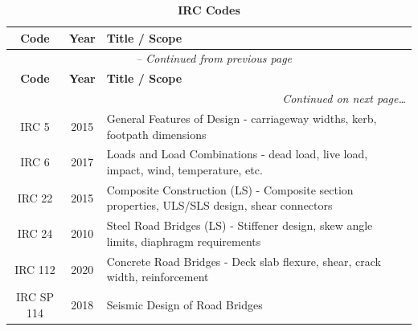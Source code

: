 \documentclass[12pt,a4paper]{report}
\numberwithin{table}{chapter}
\numberwithin{figure}{chapter}
\begin{document}
\begingroup
\setlength{\tabcolsep}{3.5pt}
\begin{longtable}{|c|c|p{12cm}|}
\caption{\textbf{IRC Codes}}\label{tab:irc-codes}\\
\hline
\textbf{Code} & \textbf{Year} & \textbf{Title / Scope} \\[6pt]
\hline
\endfirsthead

\multicolumn{3}{c}{\small\textit{\tablename\ \thetable{} -- Continued from previous page}} \\[4pt]
\hline
\textbf{Code} & \textbf{Year} & \textbf{Title / Scope} \\[6pt]
\hline
\endhead

\hline
\multicolumn{3}{|r|}{\footnotesize\textit{Continued on next page\dots}} \\
\hline
\endfoot

\hline
\endlastfoot

IRC 5 & 2015 & General Features of Design - carriageway widths, kerb, footpath dimensions \\ 
\hline
IRC 6 & 2017 & Loads and Load Combinations - dead load, live load, impact, wind, temperature, etc. \\ 
\hline
IRC 22 & 2015 & Composite Construction (LS) - Composite section properties, ULS/SLS design, shear connectors \\ 
\hline
IRC 24 & 2010 & Steel Road Bridges (LS) - Stiffener design, skew angle limits, diaphragm requirements \\ 
\hline
IRC 112 & 2020 & Concrete Road Bridges - Deck slab flexure, shear, crack width, reinforcement \\ 
\hline
IRC SP 114 & 2018 & Seismic Design of Road Bridges \\ 
\end{longtable}

\endgroup

\vspace{0.5cm}
\end{document}
